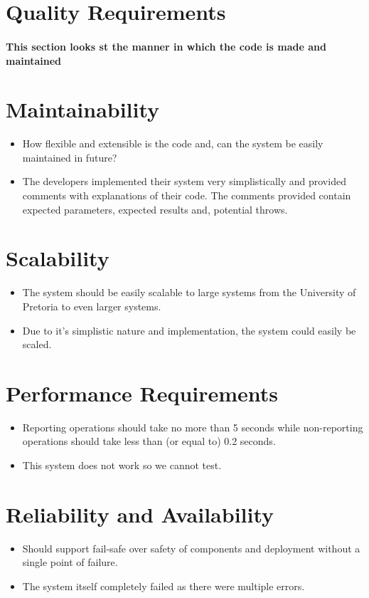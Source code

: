 \section{Quality Requirements}
\paragraph{This section looks st the manner in which the code is made and maintained}
\section{Maintainability}
	\begin{itemize}
		\item How flexible and extensible is the code and, can the system be easily maintained in future?
		\item The developers implemented their system very simplistically and provided comments with explanations of their code. The comments provided contain expected parameters, expected results and, potential throws.
	\end{itemize}
\section{Scalability}
	\begin{itemize}
		\item The system should be easily scalable to large systems from the University of Pretoria to even larger systems.
		\item Due to it's simplistic nature and implementation, the system could easily be scaled.
	\end{itemize}
\section{Performance Requirements}
	\begin{itemize}
		\item Reporting operations should take no more than 5 seconds while non-reporting operations should take less than (or equal to) 0.2 seconds.
		\item This system does not work so we cannot test.
	\end{itemize}
\section{Reliability and Availability}
	\begin{itemize}
		\item Should support fail-safe over safety of components and deployment without a single point of failure.
		\item The system itself completely failed as there were multiple errors.
	\end{itemize}
